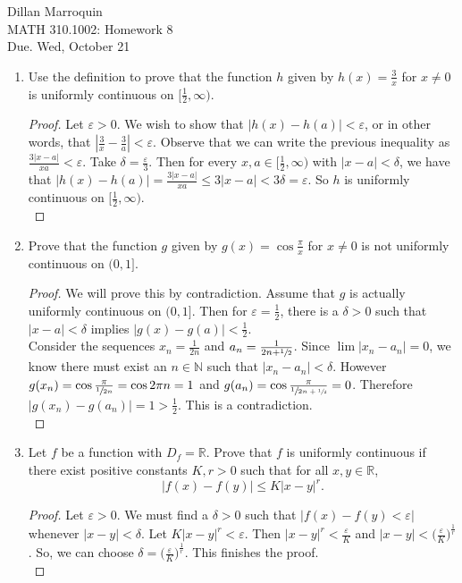 \documentclass{article}
\begin{document}
    \noindent Dillan Marroquin\\ MATH 310.1002: Homework 8\\
    Due. Wed, October 21

    \begin{enumerate}
        \item Use the definition to prove that the function $h$ given by $h(x) = \frac{3}{x}$ for $x \neq 0$ is uniformly continuous on $[\frac{1}{2}, \infty)$.
        \begin{proof}
            Let $\varepsilon > 0$. We wish to show that $|h(x)-h(a)| < \varepsilon$, or in other words, that $|\frac{3}{x}-\frac{3}{a}| < \varepsilon$. Observe that we can write the previous inequality as $\frac{3|x-a|}{xa} < \varepsilon$. Take $\delta = \frac{\varepsilon}{3}$. Then for every $x,a \in [\frac{1}{2},\infty)$ with $|x-a| < \delta$, we have that $|h(x)-h(a)| = \frac{3|x-a|}{xa} \leq 3|x-a| < 3\delta = \varepsilon$. So $h$ is uniformly continuous on $[\frac{1}{2}, \infty)$.\\
        \end{proof}
        
        \item Prove that the function $g$ given by $g(x) = \cos{\frac{\pi}{x}}$ for $x \neq 0$ is not uniformly continuous on $(0,1]$.
        \begin{proof}
            We will prove this by contradiction. Assume that $g$ is actually uniformly continuous on $(0,1]$. Then for $\varepsilon = \frac{1}{2}$, there is a $\delta > 0$ such that $|x-a| < \delta$ implies $|g(x) - g(a)| < \frac{1}{2}$.\\
            Consider the sequences $x_n = \frac{1}{2n}$ and $a_n = \frac{1}{2n+\sfrac{1}{2}}$. Since $\lim |x_n-a_n| = 0$, we know there must exist an $n \in \mathbb{N}$ such that $|x_n-a_n| < \delta$. However $g(x_n) = \cos{\frac{\pi}{\sfrac{1}{2n}}} = \cos{2\pi n} = 1$ and $g(a_n) = \cos{\frac{\pi}{\sfrac{1}{2n+\sfrac{1}{2}}}} = 0$. Therefore $|g(x_n)-g(a_n)| = 1 > \frac{1}{2}$. This is a contradiction.\\
        \end{proof}
        
        \item Let $f$ be a function with $D_f = \mathbb{R}$. Prove that $f$ is uniformly continuous if there exist positive constants $K,r > 0$ such that for all $x,y \in \mathbb{R}$,
            \[|f(x)-f(y)| \leq K|x-y|^r.\]
        \begin{proof}
            Let $\varepsilon > 0$. We must find a $\delta > 0$ such that $|f(x)-f(y) < \varepsilon|$ whenever $|x-y| < \delta$. Let $K|x-y|^r < \varepsilon$. Then $|x-y|^r < \frac{\varepsilon}{K}$ and $|x-y| < \big(\frac{\varepsilon}{K}\big)^\frac{1}{r}$. So, we can choose $\delta = \big(\frac{\varepsilon}{K}\big)^\frac{1}{r}$. This finishes the proof.\\
        \end{proof}
        

\end{enumerate}
\end{document}
